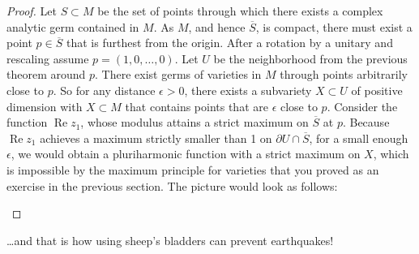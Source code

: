 \documentclass[12pt,openany]{book}
\renewcommand{\Re}{\operatorname{Re}}
\theoremstyle{plain}
\theoremstyle{remark}
\theoremstyle{definition}
\theoremstyle{exercise}
\theoremstyle{example}
\begin{document}
\begin{proof}
Let $S \subset M$ be the set of points through which there exists 
a complex analytic germ contained in $M$.
As $M$, and hence $\overline{S}$, is compact,
there must exist a point $p \in \overline{S}$
that is furthest from
the origin.  After a rotation by a unitary and rescaling assume
$p=(1,0,\ldots,0)$.  Let $U$ be the neighborhood from the previous
theorem around $p$.  There exist germs of varieties in $M$ through points
arbitrarily close to $p$.  So for any distance $\epsilon > 0$,
there exists a subvariety $X \subset U$
of positive dimension with $X \subset M$ that contains points that are
$\epsilon$ close to $p$.  Consider the function $\Re z_1$, whose modulus attains a
strict maximum on $\overline{S}$ at $p$.  Because $\Re z_1$ achieves a maximum
strictly smaller than 1 on $\partial U \cap \overline{S}$, for a small enough $\epsilon$,
we would obtain a pluriharmonic function with a strict
maximum on $X$, which is impossible by the maximum principle for
varieties that you proved as an exercise in the previous section.
The picture would look as follows:
\begin{center}
\medskip

\end{center}
\end{proof}

\vspace*{1in}

\ldots and that is how using sheep's bladders can prevent
earthquakes!



\def\myDOI#1{\href{http://dx.doi.org/#1}{#1}}
\end{document}
